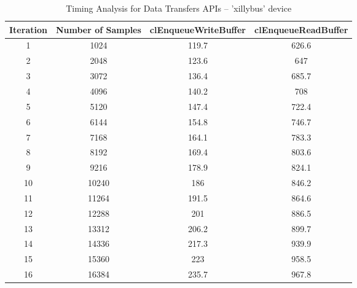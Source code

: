 \begin{table}[h]
  \centering
  \begin{adjustbox}{width=0.8\textwidth}
  \small
    \begin{tabular}{|c|c|c|c|}
    \toprule
    Iteration  & Number of Samples & clEnqueueWriteBuffer & clEnqueueReadBuffer \\
    \midrule
    1     & 1024  & 119.7 & 626.6 \\
    2     & 2048  & 123.6 & 647 \\
    3     & 3072  & 136.4 & 685.7 \\
    4     & 4096  & 140.2 & 708 \\
    5     & 5120  & 147.4 & 722.4 \\
    6     & 6144  & 154.8 & 746.7 \\
    7     & 7168  & 164.1 & 783.3 \\
    8     & 8192  & 169.4 & 803.6 \\
    9     & 9216  & 178.9 & 824.1 \\
    10    & 10240 & 186   & 846.2 \\
    11    & 11264 & 191.5 & 864.6 \\
    12    & 12288 & 201   & 886.5 \\
    13    & 13312 & 206.2 & 899.7 \\
    14    & 14336 & 217.3 & 939.9 \\
    15    & 15360 & 223   & 958.5 \\
    16    & 16384 & 235.7 & 967.8 \\
    \bottomrule
    \end{tabular}%
    \end{adjustbox}%
	\caption{Timing Analysis for Data Transfers APIs -- 'xillybus' device}
  \label{tab:xillybus_Table}%
\end{table}%
